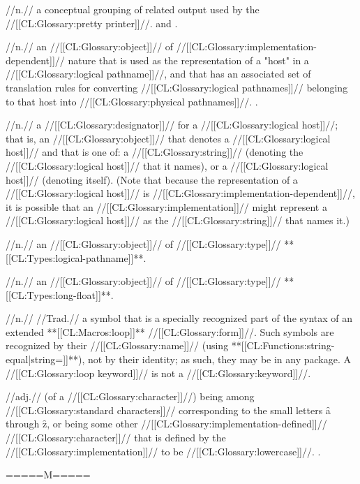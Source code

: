  //n.// a conceptual grouping of related output used by the //[[CL:Glossary:pretty printer]]//.  and \secref\DynamicControlofOutput.

 //n.// an //[[CL:Glossary:object]]// of //[[CL:Glossary:implementation-dependent]]// nature that is used as the representation of a "host" in a //[[CL:Glossary:logical pathname]]//, and that has an associated set of translation rules for converting //[[CL:Glossary:logical pathnames]]// belonging to that host into //[[CL:Glossary:physical pathnames]]//. \Seesection\LogicalPathnames.

 //n.// a //[[CL:Glossary:designator]]// for a //[[CL:Glossary:logical host]]//; that is, an //[[CL:Glossary:object]]// that denotes a //[[CL:Glossary:logical host]]// and that is one of: a //[[CL:Glossary:string]]// (denoting the //[[CL:Glossary:logical host]]// that it names), or a //[[CL:Glossary:logical host]]// (denoting itself). (Note that because the representation of a //[[CL:Glossary:logical host]]// is //[[CL:Glossary:implementation-dependent]]//, it is possible that an //[[CL:Glossary:implementation]]// might represent a //[[CL:Glossary:logical host]]// as the //[[CL:Glossary:string]]// that names it.)

 //n.// an //[[CL:Glossary:object]]// of //[[CL:Glossary:type]]// **[[CL:Types:logical-pathname]]**.

 //n.// an //[[CL:Glossary:object]]// of //[[CL:Glossary:type]]// **[[CL:Types:long-float]]**.

 //n.// //Trad.// a symbol that is a specially recognized part of the syntax of an extended **[[CL:Macros:loop]]** //[[CL:Glossary:form]]//. Such symbols are recognized by their //[[CL:Glossary:name]]// (using **[[CL:Functions:string-equal|string=]]**), not by their identity; as such, they may be in any package. A //[[CL:Glossary:loop keyword]]// is not a //[[CL:Glossary:keyword]]//.

 //adj.// (of a //[[CL:Glossary:character]]//) being among //[[CL:Glossary:standard characters]]// corresponding to the small letters \f{a} through \f{z}, or being some other //[[CL:Glossary:implementation-defined]]// //[[CL:Glossary:character]]// that is defined by the //[[CL:Glossary:implementation]]// to be //[[CL:Glossary:lowercase]]//. \Seesection\CharactersWithCase.

=====M=====
 
